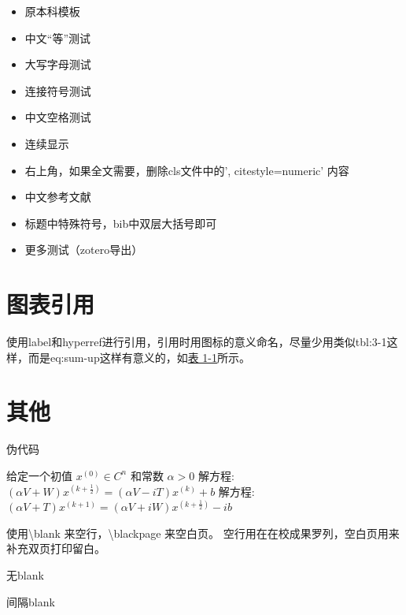 \begin{itemize}
    \item 原本科模板\cite{partl2016}
    \item 中文“等”测试\cite{partl2021}
    \item 大写字母测试\cite{partl2022-2}
    \item 连接符号测试\cite{partl2022-3}
    \item 中文空格测试\cite{partl2022}
    \item 连续显示\cite{partl2021,partl2022-2,partl2022-3}
    \item 右上角\supercite{partl2016,partl2021,partl2022-2}，如果全文需要，删除cls文件中的', citestyle=numeric' 内容
    \item 中文参考文献 \cite{李刚2006基于动态光谱的脉搏血氧测量精度分析}
    \item 标题中特殊符号，bib中双层大括号即可 \cite{PhysRevLett.108.024101}
    \item 更多测试（zotero导出）\cite{huangInvestigationThermalRectification2024, wanModulatingThermalConductivity2024, wuThermalRectificationAsymmetric2024, xiaoMOFNanozymemediatedAcetylcholinesterasefree2024}
\end{itemize}

\section{图表引用}


使用label和hyperref进行引用，引用时用图标的意义命名，尽量少用类似tbl:3-1这样，而是eq:sum-up这样有意义的，如\hyperref[tbl:mole]{表 1-1}所示。

\section{其他}


伪代码

\begin{algorithm}[H]
    \caption{PMHSS 算法\label{Alg:PMHSS}}
    \begin{algorithmic}[1]
        \State 给定一个初值 $ x^{(0)} \in C^{n} $  和常数 $\alpha>0$
        \State 解方程: $(\alpha V+W)x^{(k+\frac{1}{2})}=(\alpha V-i T)x^{(k)}+b $
        \State 解方程: $(\alpha V+T)x^{(k+1)}=(\alpha V+i W)x^{(k+\frac{1}{2})}-i b$
        \EndFor
    \end{algorithmic}
\end{algorithm}

使用\textbackslash blank 来空行，\textbackslash blackpage 来空白页。
空行用在在校成果罗列，空白页用来补充双页打印留白。

无blank

\blank

间隔blank
\blankpage
